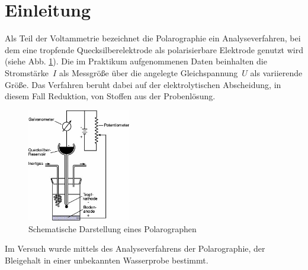 \section{Einleitung}
\label{sec:einleitung}

Als Teil der Voltammetrie bezeichnet die Polarographie ein Analyseverfahren, bei dem eine tropfende Quecksilberelektrode als polarisierbare Elektrode genutzt wird (siehe Abb. \ref{fig:schema_polarograph}). Die im Praktikum aufgenommenen Daten beinhalten die \mbox{Stromstärke $I$} als Messgröße über die angelegte \mbox{Gleichspannung $U$} als variierende Größe. Das Verfahren beruht dabei auf der elektrolytischen Abscheidung, in diesem Fall Reduktion, von Stoffen aus der Probenlösung.\cite{Brehm.2004}

\begin{figure}[h!]
	\centering
	\includegraphics[width=0.4\textwidth]{img/Polarograph}
	\caption{Schematische Darstellung eines Polarographen \cite{Brehm.2004}}
	\label{fig:schema_polarograph}
\end{figure}
\FloatBarrier

Im Versuch wurde mittels des Analyseverfahrens der Polarographie, der Bleigehalt in einer unbekannten Wasserprobe bestimmt.
